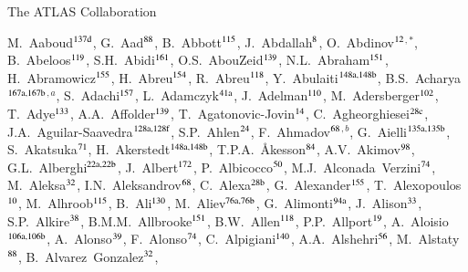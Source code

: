 \begin{flushleft}
{\Large The ATLAS Collaboration}

\bigskip

M.~Aaboud$^\textrm{\scriptsize 137d}$,
G.~Aad$^\textrm{\scriptsize 88}$,
B.~Abbott$^\textrm{\scriptsize 115}$,
J.~Abdallah$^\textrm{\scriptsize 8}$,
O.~Abdinov$^\textrm{\scriptsize 12}$$^{,*}$,
B.~Abeloos$^\textrm{\scriptsize 119}$,
S.H.~Abidi$^\textrm{\scriptsize 161}$,
O.S.~AbouZeid$^\textrm{\scriptsize 139}$,
N.L.~Abraham$^\textrm{\scriptsize 151}$,
H.~Abramowicz$^\textrm{\scriptsize 155}$,
H.~Abreu$^\textrm{\scriptsize 154}$,
R.~Abreu$^\textrm{\scriptsize 118}$,
Y.~Abulaiti$^\textrm{\scriptsize 148a,148b}$,
B.S.~Acharya$^\textrm{\scriptsize 167a,167b}$$^{,a}$,
S.~Adachi$^\textrm{\scriptsize 157}$,
L.~Adamczyk$^\textrm{\scriptsize 41a}$,
J.~Adelman$^\textrm{\scriptsize 110}$,
M.~Adersberger$^\textrm{\scriptsize 102}$,
T.~Adye$^\textrm{\scriptsize 133}$,
A.A.~Affolder$^\textrm{\scriptsize 139}$,
T.~Agatonovic-Jovin$^\textrm{\scriptsize 14}$,
C.~Agheorghiesei$^\textrm{\scriptsize 28c}$,
J.A.~Aguilar-Saavedra$^\textrm{\scriptsize 128a,128f}$,
S.P.~Ahlen$^\textrm{\scriptsize 24}$,
F.~Ahmadov$^\textrm{\scriptsize 68}$$^{,b}$,
G.~Aielli$^\textrm{\scriptsize 135a,135b}$,
S.~Akatsuka$^\textrm{\scriptsize 71}$,
H.~Akerstedt$^\textrm{\scriptsize 148a,148b}$,
T.P.A.~{\AA}kesson$^\textrm{\scriptsize 84}$,
A.V.~Akimov$^\textrm{\scriptsize 98}$,
G.L.~Alberghi$^\textrm{\scriptsize 22a,22b}$,
J.~Albert$^\textrm{\scriptsize 172}$,
P.~Albicocco$^\textrm{\scriptsize 50}$,
M.J.~Alconada~Verzini$^\textrm{\scriptsize 74}$,
M.~Aleksa$^\textrm{\scriptsize 32}$,
I.N.~Aleksandrov$^\textrm{\scriptsize 68}$,
C.~Alexa$^\textrm{\scriptsize 28b}$,
G.~Alexander$^\textrm{\scriptsize 155}$,
T.~Alexopoulos$^\textrm{\scriptsize 10}$,
M.~Alhroob$^\textrm{\scriptsize 115}$,
B.~Ali$^\textrm{\scriptsize 130}$,
M.~Aliev$^\textrm{\scriptsize 76a,76b}$,
G.~Alimonti$^\textrm{\scriptsize 94a}$,
J.~Alison$^\textrm{\scriptsize 33}$,
S.P.~Alkire$^\textrm{\scriptsize 38}$,
B.M.M.~Allbrooke$^\textrm{\scriptsize 151}$,
B.W.~Allen$^\textrm{\scriptsize 118}$,
P.P.~Allport$^\textrm{\scriptsize 19}$,
A.~Aloisio$^\textrm{\scriptsize 106a,106b}$,
A.~Alonso$^\textrm{\scriptsize 39}$,
F.~Alonso$^\textrm{\scriptsize 74}$,
C.~Alpigiani$^\textrm{\scriptsize 140}$,
A.A.~Alshehri$^\textrm{\scriptsize 56}$,
M.~Alstaty$^\textrm{\scriptsize 88}$,
B.~Alvarez~Gonzalez$^\textrm{\scriptsize 32}$,
$$
\end{flushleft}
